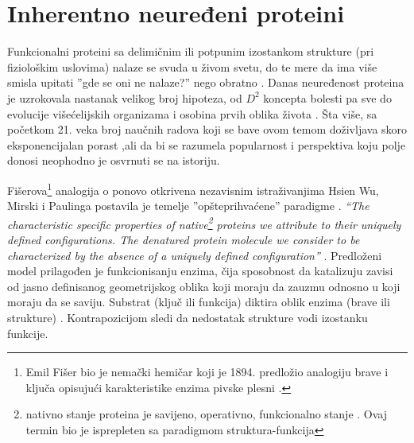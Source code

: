 
\chapter{Inherentno neuređeni proteini} %

\label{IDP} %


Funkcionalni proteini sa delimičnim ili potpunim izostankom strukture (pri
fiziološkim uslovima) nalaze se svuda u živom svetu, do te mere da ima više
smisla upitati ''gde se oni ne nalaze?'' nego obratno \parencite{uversky2016}.
Danas neuređenost proteina je uzrokovala nastanak velikog broj hipoteza, od
$D^2$ koncepta bolesti \parencite{Uversky2008} pa sve do evolucije
višećelijskih organizama \parencite{Romero2006} i osobina prvih oblika života
\parencite{Trifonov2000, uversky2016}. Šta više, sa početkom 21. veka broj
naučnih radova koji se bave ovom temom doživljava skoro eksponencijalan
porast \parencite{oldfield2014},ali  da bi se razumela popularnost i 
perspektiva koju polje donosi neophodno je osvrnuti se na istoriju.

Fišerova\footnote{ Emil Fišer bio je nemački hemičar koji je 1894. predložio
analogiju brave i ključa opisujući karakteristike enzima pivske
plesni \parencite{dunker2001}.  } analogija o  ponovo
otkrivena nezavisnim istraživanjima Hsien Wu,  Mirski i Paulinga 
postavila je temelje ''opšteprihvaćene''
 paradigme \parencite{dunker2001}.
\textit{“The characteristic specific properties of native\footnote{ nativno stanje
  proteina je savijeno, operativno, funkcionalno stanje \parencite{dunker2001}.
Ovaj termin bio je isprepleten sa paradigmom struktura-funkcija} proteins we
attribute to their uniquely defined configurations. The denatured protein
molecule we consider to be characterized by the absence of a uniquely defined
configuration”} \parencite{MirskyPauling1936}. Predloženi model prilagođen je
funkcionisanju enzima, čija sposobnost da katalizuju zavisi od jasno
definisanog geometrijskog oblika koji moraju da zauzmu odnosno u koji moraju da
se saviju.  Substrat (ključ ili funkcija) diktira oblik enzima (brave ili
strukture) \parencite{biology}.  Kontrapozicijom sledi da nedostatak strukture
vodi izostanku funkcije.

